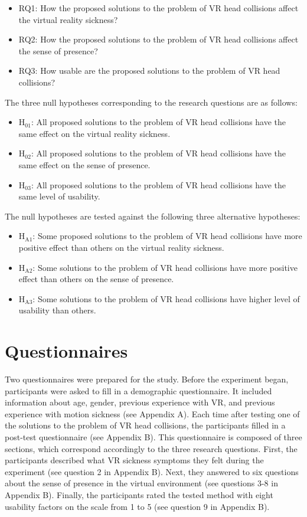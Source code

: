 \begin{itemize}
\item RQ1: How the proposed solutions to the problem of VR head collisions affect the virtual reality sickness?
\item RQ2: How the proposed solutions to the problem of VR head collisions affect the sense of presence?
\item RQ3: How usable are the proposed solutions to the problem of VR head collisions?
\end{itemize}

The three null hypotheses corresponding to the research questions are as follows:

\begin{itemize}
\item H$_{\text{01}}$: All proposed solutions to the problem of VR head collisions have the same effect on the virtual reality sickness.
\item H$_{\text{02}}$: All proposed solutions to the problem of VR head collisions have the same effect on the sense of presence.
\item H$_{\text{03}}$: All proposed solutions to the problem of VR head collisions have the same level of usability.
\end{itemize}

The null hypotheses are tested against the following three alternative hypotheses:

\begin{itemize}
\item H$_{\text{A1}}$: Some proposed solutions to the problem of VR head collisions have more positive effect than others on the virtual reality sickness.
\item H$_{\text{A2}}$: Some solutions to the problem of VR head collisions have more positive effect than others on the sense of presence.
\item H$_{\text{A3}}$: Some solutions to the problem of VR head collisions have higher level of usability than others.
\end{itemize}

\section{Questionnaires}

Two questionnaires were prepared for the study. Before the experiment began, participants were asked to fill in a demographic questionnaire. It included information about age, gender, previous experience with VR, and previous experience with motion sickness (see Appendix A). Each time after testing one of the solutions to the problem of VR head collisions, the participants filled in a post-test questionnaire (see Appendix B). This questionnaire is composed of three sections, which correspond accordingly to the three research questions. First, the participants described what VR sickness symptoms they felt during the experiment (see question 2 in Appendix B). Next, they answered to six questions about the sense of presence in the virtual environment (see questions 3-8 in Appendix B). Finally, the participants rated the tested method with eight usability factors on the scale from 1 to 5 (see question 9 in Appendix B).

